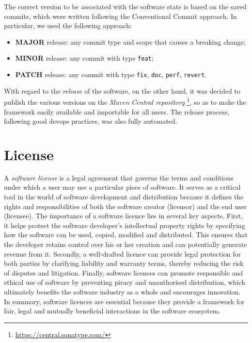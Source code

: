 \documentclass[12pt,a4paper,openright,twoside]{book}
\begin{document}
The correct version to be associated with the software state is based on the saved commits, 
    which were written following the Conventional Commit approach. In particular, we used the following approach:
    \begin{itemize}
        \item \textbf{MAJOR} release: any commit type and scope that causes a breaking change;
        \item \textbf{MINOR} release: any commit with type \texttt{feat};
        \item \textbf{PATCH} release: any commit with type \texttt{fix}, \texttt{doc}, \texttt{perf}, \texttt{revert}.
    \end{itemize}

With regard to the \emph{release} of the software, on the other hand, it was decided to publish the various versions 
    on the \emph{Maven Central repository} \footnote{\url{https://central.sonatype.com/}}, so as to make the framework easily available and importable for all users.  
    The release process, following good devops practices, was also fully automated.


\section{License}

A \emph{software license} is a legal agreement that governs the terms and conditions under which a user may use a particular piece of software.
    It serves as a critical tool in the world of software development and distribution because it defines the rights and responsibilities of both 
    the software creator (licensor) and the end user (licensee). The importance of a software licence lies in several key aspects. 
    First, it helps protect the software developer's intellectual property rights by specifying how the software can be used, copied,
    modified and distributed. This ensures that the developer retains control over his or her creation and can potentially generate 
    revenue from it. Secondly, a well-drafted licence can provide legal protection for both parties by clarifying liability and warranty 
    terms, thereby reducing the risk of disputes and litigation. Finally, software licences can promote responsible and ethical use of 
    software by preventing piracy and unauthorised distribution, which ultimately benefits the software industry as a whole and 
    encourages innovation. In summary, software licences are essential because they provide a framework for fair, legal and mutually 
    beneficial interactions in the software ecosystem.
\end{document}
